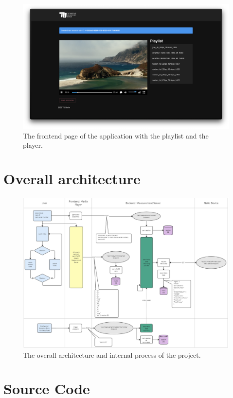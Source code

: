 \begin{appendices}
 \begin{figure}[ht]
     \centering
     \includegraphics[width=0.8\linewidth]{assets/mediaplayer2.png}
     \caption{The frontend page of the application with the playlist and the player.}
     \label{fig:media_player2}
 \end{figure}

\section{Overall architecture}

 \begin{figure}[ht]
     \centering
     \includegraphics[width=1\linewidth]{assets/architecture_diagram.png}
     \caption{The overall architecture and internal process of the project.}
     \label{fig:project_architecture}
 \end{figure}


\section{Source Code}

\end{appendices}